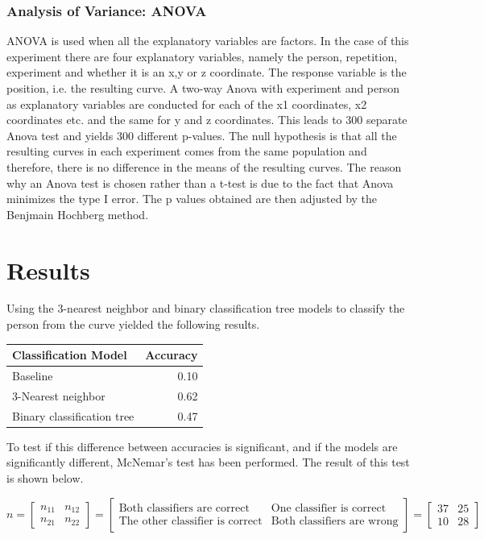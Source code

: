 \documentclass[11pt, fleqn, titlepage]{article}
\begin{document}
\subsubsection*{Analysis of Variance: ANOVA}
ANOVA is used when all the explanatory variables are factors. In the case of this experiment there are four explanatory variables, namely the person, repetition, experiment and whether it is an x,y or z coordinate. The response variable is the position, i.e. the resulting curve. A two-way Anova with experiment and person as explanatory variables are conducted for each of the x1 coordinates, x2 coordinates etc. and the same for y and z coordinates. This leads to 300 separate Anova test and yields 300 different p-values. The null hypothesis is that all the resulting curves in each experiment comes from the same population and therefore, there is no difference in the means of the resulting curves. The reason why an Anova test is chosen rather than a t-test is due to the fact that Anova minimizes the type I error. The p values obtained are then adjusted by the Benjmain Hochberg method. \cite{statbog}


\section{Results}
Using the 3-nearest neighbor and binary classification tree models to classify the person from the curve yielded the following results.

\begin{table}[h]
	\centering
	\begin{tabular}{l r}
		\toprule
		Classification Model       & Accuracy  \\ \midrule
		Baseline                   & 0.10      \\
		3-Nearest neighbor         & 0.62      \\ 
		Binary classification tree & 0.47      \\ \bottomrule
	\end{tabular}
\end{table}

\noindent To test if this difference between accuracies is significant, and if the models are significantly different, McNemar's test has been performed. The result of this test is shown below.

\[n = \begin{bmatrix} n_{11} & n_{12} \\ n_{21} & n_{22} \end{bmatrix} = \begin{bmatrix} \text{Both classifiers are correct} & \text{One classifier is correct} \\ \text{The other classifier is correct} & \text{Both classifiers are wrong} \end{bmatrix} = \begin{bmatrix} 37 & 25 \\ 10 & 28 \end{bmatrix}\] 
\end{document}

